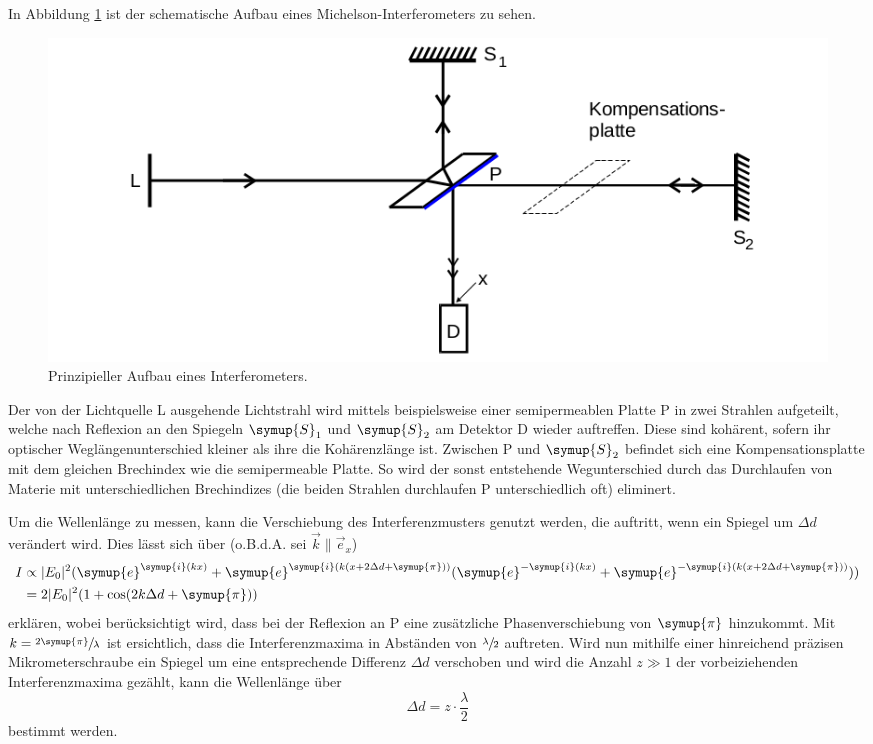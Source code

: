 In Abbildung \ref{fig:Aufbau_Interf} ist der schematische Aufbau eines Michelson-Interferometers zu sehen. 
\begin{figure}
    \centering
    \includegraphics[width=\textwidth]{plots/Aufbau_Interf.png}
    \caption{Prinzipieller Aufbau eines Interferometers.}
    \label{fig:Aufbau_Interf}
\end{figure}
Der von der Lichtquelle L ausgehende Lichtstrahl wird mittels beispielsweise einer semipermeablen Platte P in zwei Strahlen aufgeteilt, 
welche nach Reflexion an den Spiegeln $\symup{S}_1$ und $\symup{S}_2$ am Detektor D wieder auftreffen. 
Diese sind kohärent, sofern ihr optischer Weglängenunterschied kleiner als ihre die Kohärenzlänge ist. 
Zwischen P und $\symup{S}_2$ befindet sich eine Kompensationsplatte mit dem gleichen Brechindex wie die semipermeable Platte.
So wird der sonst entstehende Wegunterschied durch das Durchlaufen von Materie mit unterschiedlichen Brechindizes (die beiden 
Strahlen durchlaufen P unterschiedlich oft) eliminert. 

Um die Wellenlänge zu messen, kann die Verschiebung des Interferenzmusters genutzt werden, die auftritt, wenn ein Spiegel um $\Delta d$ verändert wird. 
Dies lässt sich über (o.B.d.A. sei $\vec{k} \parallel \vec{e}_x$) 
\begin{align*}
    I &\propto |E_0|^2 (\symup{e}^{\symup{i}(kx)}+\symup{e}^{\symup{i}(k(x+2\Delta d + \symup{\pi}))}(\symup{e}^{-\symup{i}(kx)}+\symup{e}^{-\symup{i}(k(x+2\Delta d + \symup{\pi}))})) \\
      &= 2|E_0|^2(1+\cos (2k \Delta d + \symup{\pi}))
\end{align*}
erklären, wobei berücksichtigt wird, dass bei der Reflexion an P eine zusätzliche Phasenverschiebung von $\symup{\pi}$ hinzukommt. 
Mit $k=\sfrac{2\symup{\pi}}{\lambda}$ ist ersichtlich, dass die Interferenzmaxima in Abständen von $\sfrac{\lambda}{2}$ auftreten. 
Wird nun mithilfe einer hinreichend präzisen Mikrometerschraube ein Spiegel um eine entsprechende Differenz $\Delta d$
verschoben und wird die Anzahl $z\gg 1$ der vorbeiziehenden Interferenzmaxima gezählt, kann die Wellenlänge über 
\begin{equation*}
    \Delta d=z \cdot \frac{\lambda}{2}
\end{equation*}
bestimmt werden. 

